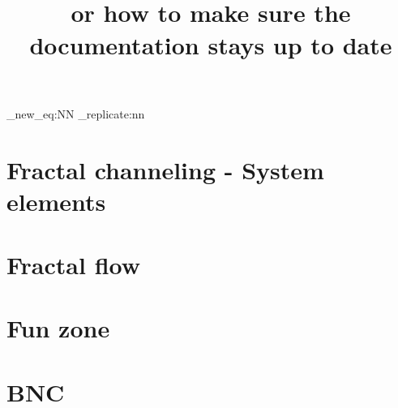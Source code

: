

\title{\\  \huge or how to make sure the\\documentation stays up to date}


\maketitle
\newpage
\tableofcontents  
\newpage
\listoftables
\newpage
\listoffigures

\setcounter{secnumdepth}{4}


\ExplSyntaxOn
\cs_new_eq:NN \Repeat \prg_replicate:nn
\ExplSyntaxOff


\newpage
\part{Fractal channeling - System elements}

\newpage
\part{Fractal flow} 

\newpage
\part{Fun zone}

\newpage
\part{BNC}



% 


\newpage


